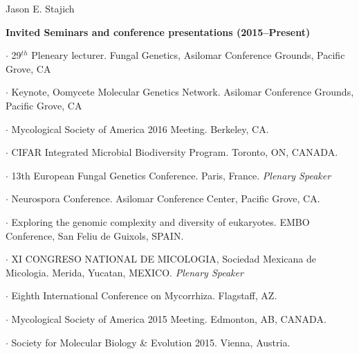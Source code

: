 \documentclass[10pt]{article}
\begin{document}
\begin{cv}{\centerline{Jason E. Stajich}}
\setlength{\cvlabelwidth}{8mm}
\begin{cvlistcompact}{\bf Invited Seminars and conference presentations (2015--Present)}
\item [2017] $\cdot$ 29$^{th}$ Pleneary lecturer. Fungal Genetics,
  Asilomar Conference Grounds, Pacific Grove, CA
  \item $\cdot$ Keynote, Oomycete Molecular Genetics Network. Asilomar Conference Grounds, Pacific Grove, CA
\item [2016] $\cdot$
  Mycological Society of America 2016 Meeting. Berkeley, CA. 
\item $\cdot$
    CIFAR Integrated Microbial Biodiversity Program. Toronto, ON, CANADA.
  \item $\cdot$   %
    13th European Fungal Genetics Conference.
    Paris, France.  {\it Plenary Speaker}
  \item $\cdot$ %
    Neurospora Conference. Asilomar Conference Center, Pacific
    Grove, CA.
\item [2015] $\cdot$ %
  Exploring the genomic complexity and diversity of
  eukaryotes. EMBO Conference, San Feliu de Guixols, SPAIN. 
\item $\cdot$   %
  XI CONGRESO NATIONAL DE MICOLOGIA, Sociedad Mexicana de
  Micologia. Merida, Yucatan, MEXICO. {\it Plenary Speaker}
  \item $\cdot$ %
    Eighth International Conference on Mycorrhiza.
    Flagstaff, AZ. 
  \item $\cdot$ %
    Mycological Society of America 2015 Meeting. Edmonton, AB, CANADA. 
  \item $\cdot$  %
    Society for Molecular Biology \& Evolution 2015. Vienna, Austria.
\end{cvlistcompact}


\end{cv}
\end{document}
